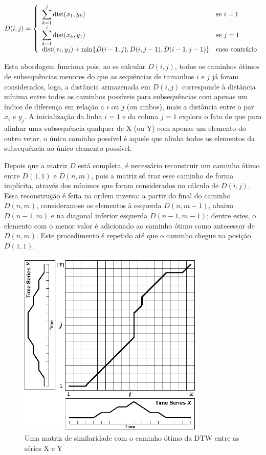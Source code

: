 \begin{equation*}
    D(i, j) = \left\{\begin{array}{ll}
    \displaystyle\sum_{k=1}^j\mbox{dist}(x_1,y_k)&\mbox{se\ }i=1\\
    \displaystyle\sum_{k=1}^i\mbox{dist}(x_k,y_1)&\mbox{se\ }j=1\\
    \mbox{dist}(x_i, y_j) + \min\{D(i - 1, j), D(i, j - 1), D(i - 1, j - 1)\}&\mbox{caso contrário}
    \end{array}\right.
\end{equation*}

Esta abordagem funciona pois, ao se calcular $D(i,j)$, todos os caminhos ótimos de subsequências menores do que as sequências de tamanhos $i$ e $j$ já foram considerados, logo, a distância armazenada em $D(i, j)$ corresponde à distância mínima entre todos os caminhos possíveis para subsequências com apenas um índice de diferença em relação a $i$ ou $j$ (ou ambos), mais a distância entre o par $x_i$ e $y_j$. A inicialização da linha $i=1$ e da coluna $j=1$ explora o fato de que para alinhar uma subsequência qualquer de X (ou Y) com apenas um elemento do outro vetor, o único caminho possível é aquele que alinha todos os elementos da subsequência ao único elemento possível.

Depois que a matriz $D$ está completa, é necessário reconstruir um caminho ótimo entre $D(1, 1)$ e $D(n, m)$, pois a matriz só traz esse caminho de forma implícita, através dos mínimos que foram considerados no cálculo de $D(i,j)$. Essa reconstrução é feita na ordem inversa: a partir do final do caminho $D(n, m)$, consideram-se os elementos à esquerda $D(n,m-1)$, abaixo $D(n-1,m)$ e na diagonal inferior esquerda $D(n-1,m-1)$; dentre estes, o elemento com o menor valor é adicionado ao caminho ótimo como antecessor de $D(n,m)$. Este procedimento é repetido até que o caminho chegue na posição $D(1, 1)$.

\begin{figure}[htb]
\centering
\includegraphics[width=9cm]{figuras/dtw_warp_path.png}
\caption{Uma matriz de similaridade com o caminho ótimo da DTW entre as séries X e Y\citep{salvador2007toward}}
\label{fig:dtw-matrix-and-path}
\end{figure}

